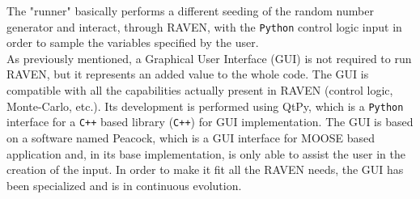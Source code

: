 \documentclass{anstrans}
\begin{document}
The "runner" basically performs a different seeding of the random number generator and interact, through RAVEN, with the \verb!Python! control logic input in order to sample the variables specified by the user.
\\As previously mentioned, a Graphical User Interface (GUI) is not required to run RAVEN, but it represents an added value to the whole code. The GUI is compatible with all the capabilities actually present in RAVEN (control logic, Monte-Carlo, etc.).  Its development is performed using QtPy, which is a \verb!Python! interface for a \verb!C++! based library (\verb!C++!) for GUI implementation. The GUI is based on a software named Peacock, which is a GUI interface for MOOSE based application and, in its base implementation, is only able to assist the user in the creation of the input.  In order to make it fit all the RAVEN needs, the GUI has been specialized and is in continuous evolution.
\end{document}
